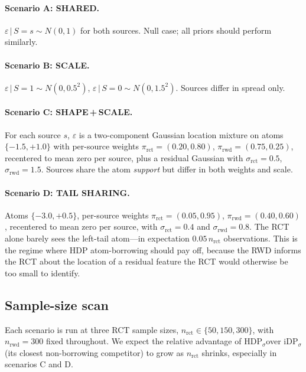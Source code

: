 \documentclass[11pt]{article}
\theoremstyle{plain}
\theoremstyle{definition}
\theoremstyle{remark}
\newcommand{\1}{\mathds{1}}
\newcommand{\given}{\,|\,}
\newcommand{\miDPs}{\ensuremath{\mathrm{iDP}_\sigma}}
\newcommand{\mHDPs}{\ensuremath{\mathrm{HDP}_\sigma}}
\begin{document}
\paragraph{Scenario A: SHARED.}
$\varepsilon \given S = s \sim N(0, 1)$ for both sources. Null case;
all priors should perform similarly.

\paragraph{Scenario B: SCALE.}
$\varepsilon \given S = 1 \sim N(0, 0.5^2)$,
$\varepsilon \given S = 0 \sim N(0, 1.5^2)$. Sources differ in spread
only.

\paragraph{Scenario C: SHAPE\,+\,SCALE.}
For each source $s$, $\varepsilon$ is a two-component Gaussian
location mixture on atoms $\{-1.5, +1.0\}$ with per-source weights
$\pi_{\text{rct}} = (0.20, 0.80)$, $\pi_{\text{rwd}} = (0.75, 0.25)$,
recentered to mean zero per source, plus a residual Gaussian with
$\sigma_{\text{rct}} = 0.5$, $\sigma_{\text{rwd}} = 1.5$. Sources
share the atom \emph{support} but differ in both weights and scale.

\paragraph{Scenario D: TAIL SHARING.}
Atoms $\{-3.0, +0.5\}$, per-source weights
$\pi_{\text{rct}} = (0.05, 0.95)$, $\pi_{\text{rwd}} = (0.40, 0.60)$,
recentered to mean zero per source, with $\sigma_{\text{rct}} = 0.4$
and $\sigma_{\text{rwd}} = 0.8$. The RCT alone barely sees the
left-tail atom---in expectation $0.05\, n_{\text{rct}}$ observations.
This is the regime where HDP atom-borrowing should pay off, because the
RWD informs the RCT about the location of a residual feature the RCT
would otherwise be too small to identify.

\subsection{Sample-size scan}
\label{sec:sim-sample-size}

Each scenario is run at three RCT sample sizes,
$n_{\text{rct}} \in \{50, 150, 300\}$, with $n_{\text{rwd}} = 300$
fixed throughout. We expect the relative advantage of
\mHDPs over \miDPs (its
closest non-borrowing competitor) to grow as $n_{\text{rct}}$ shrinks,
especially in scenarios C and D.
\end{document}
